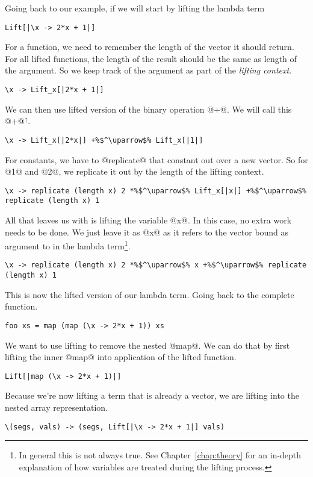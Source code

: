 Going back to our example, if we will start by lifting the lambda term
%
\begin{lstlisting}[style=ndp]
Lift[|\x -> 2*x + 1|]
\end{lstlisting}
%
For a function, we need to remember the length of the vector it should return. For all lifted functions, the length of the result should be the same as length of the argument. So we keep track of the argument as part of the \emph{lifting context}.
%
\begin{lstlisting}[style=ndp]
\x -> Lift_x[|2*x + 1|]
\end{lstlisting}
%
We can then use lifted version of the binary operation @+@. We will call this @+@$^\uparrow$.
%
\begin{lstlisting}[style=ndp]
\x -> Lift_x[|2*x|] +%$^\uparrow$% Lift_x[|1|]
\end{lstlisting}
%
For constants, we have to @replicate@ that constant out over a new vector. So for @1@ and @2@, we replicate it out by the length of the lifting context.
%
\begin{lstlisting}[style=ndp]
\x -> replicate (length x) 2 *%$^\uparrow$% Lift_x[|x|] +%$^\uparrow$% replicate (length x) 1
\end{lstlisting}
%
All that leaves us with is lifting the variable @x@. In this case, no extra work needs to be done. We just leave it as @x@ as it refers to the vector bound as argument to in the lambda term\footnote{In general this is not always true. See Chapter~\ref{chap:theory} for an in-depth explanation of how variables are treated during the lifting process.}.
%
\begin{lstlisting}[style=ndp]
\x -> replicate (length x) 2 *%$^\uparrow$% x +%$^\uparrow$% replicate (length x) 1
\end{lstlisting}
%
This is now the lifted version of our lambda term. Going back to the complete function.
%
\begin{lstlisting}
foo xs = map (map (\x -> 2*x + 1)) xs
\end{lstlisting}
%
We want to use lifting to remove the nested @map@. We can do that by first lifting the inner @map@ into application of the lifted function.
%
\begin{lstlisting}
Lift[|map (\x -> 2*x + 1)|]
\end{lstlisting}
%
Because we're now lifting a term that is already a vector, we are lifting into the nested array representation.
%
\begin{lstlisting}[style=ndp]
\(segs, vals) -> (segs, Lift[|\x -> 2*x + 1|] vals)
\end{lstlisting}
